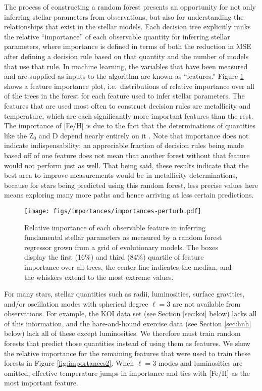 \documentclass[twocolumn,twocolappendix]{aastex6}
\newcommand{\colwidth}{\linewidth}
\newif\ifref
\newcommand{\mb}[1]{\ifref\boldmath\textbf{#1}\unboldmath\else #1\fi}
\begin{document}
\mb{The process of constructing a random forest} presents an opportunity for not only inferring stellar parameters from observations, but also for understanding the relationships that exist in the \mb{stellar models}. Each decision tree explicitly ranks the relative ``importance'' of each observable quantity \mb{for inferring stellar parameters}, where importance is defined in terms of both the reduction in MSE after defining a decision rule based on that quantity and the number of models that use that rule. \mb{In machine learning, the variables that have been measured and are supplied as inputs to the algorithm are known as ``features.'' Figure \ref{fig:importances} shows a feature importance plot, i.e.~distributions of relative importance over all of the trees in the forest for each feature used to infer stellar parameters. The features that are used most often to construct decision rules are metallicity and temperature, which are each significantly more important features than the rest.} The importance of [Fe/H] is due to the fact that the determinations of quantities like the Z$_0$ and D depend nearly entirely on it \citep[see also][]{main-sequence-stats}. Note that importance does not indicate indispensability: an appreciable fraction of decision rules being made based off of \mb{one feature} does not mean that another forest without that \mb{feature} would not perform just as well. That being said, these results indicate that the best area to improve measurements would be in metallicity determinations, because for stars being predicted using this random forest, less precise values here means exploring many more paths and hence arriving at less certain predictions. 



\begin{figure}
    \centering
    \texttt{[image: figs/importances/importances-perturb.pdf]}
    \caption{Relative importance of each observable feature in inferring fundamental stellar parameters as measured by a random forest regressor grown from a grid of evolutionary models. The boxes display the first (16\%) and third (84\%) quartile of feature importance over all trees, the center line indicates the median, and the whiskers extend to the most extreme values.}
    \label{fig:importances}
\end{figure}

For many stars, \mb{stellar quantities} such as radii, luminosities, surface gravities, and/or oscillation modes with spherical degree $\ell=3$ are not available from observations. For example, the KOI data set \mb{(see Section \ref{sec:koi} below)} lacks all of this information, and the hare-and-hound exercise data \mb{(see Section \ref{sec:hnh} below)} lack all of these except luminosities. We therefore must train random forests that predict those quantities instead of using them as \mb{features}. We show the relative importance for \mb{the remaining features that were} used to train these forests in Figure \ref{fig:importances2}. When $\ell=3$ modes and luminosities are omitted, effective temperature jumps in importance and ties with [Fe/H] as the most \mb{important feature}. 
\end{document}
